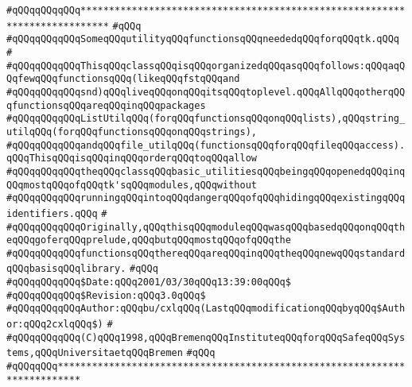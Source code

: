 \label{src/lib/tk/src/basic_util.api}
\verb|#qQQqqQQqqQQq***************************************************************************|\newline
\verb|#qQQq|\newline
\verb|#qQQqqQQqqQQqSomeqQQqutilityqQQqfunctionsqQQqneededqQQqforqQQqtk.qQQq|\newline
\verb|#|\newline
\verb|#qQQqqQQqqQQqThisqQQqclassqQQqisqQQqorganizedqQQqasqQQqfollows:qQQqaqQQqfewqQQqfunctionsqQQq(likeqQQqfstqQQqand|\newline
\verb|#qQQqqQQqqQQqsnd)qQQqliveqQQqonqQQqitsqQQqtoplevel.qQQqAllqQQqotherqQQqfunctionsqQQqareqQQqinqQQqpackages|\newline
\verb|#qQQqqQQqqQQqListUtilqQQq(forqQQqfunctionsqQQqonqQQqlists),qQQqstring_utilqQQq(forqQQqfunctionsqQQqonqQQqstrings),|\newline
\verb|#qQQqqQQqqQQqandqQQqfile_utilqQQq(functionsqQQqforqQQqfileqQQqaccess).qQQqThisqQQqisqQQqinqQQqorderqQQqtoqQQqallow|\newline
\verb|#qQQqqQQqqQQqtheqQQqclassqQQqbasic_utilitiesqQQqbeingqQQqopenedqQQqinqQQqmostqQQqofqQQqtk'sqQQqmodules,qQQqwithout|\newline
\verb|#qQQqqQQqqQQqrunningqQQqintoqQQqdangerqQQqofqQQqhidingqQQqexistingqQQqidentifiers.qQQq|\newline
\verb|#|\newline
\verb|#qQQqqQQqqQQqOriginally,qQQqthisqQQqmoduleqQQqwasqQQqbasedqQQqonqQQqtheqQQqgoferqQQqprelude,qQQqbutqQQqmostqQQqofqQQqthe|\newline
\verb|#qQQqqQQqqQQqfunctionsqQQqthereqQQqareqQQqinqQQqtheqQQqnewqQQqstandardqQQqbasisqQQqlibrary.|\newline
\verb|#qQQq|\newline
\verb|#qQQqqQQqqQQq$Date:qQQq2001/03/30qQQq13:39:00qQQq$|\newline
\verb|#qQQqqQQqqQQq$Revision:qQQq3.0qQQq$|\newline
\verb|#qQQqqQQqqQQqAuthor:qQQqbu/cxlqQQq(LastqQQqmodificationqQQqbyqQQq$Author:qQQq2cxlqQQq$)|\newline
\verb|#|\newline
\verb|#qQQqqQQqqQQq(C)qQQq1998,qQQqBremenqQQqInstituteqQQqforqQQqSafeqQQqSystems,qQQqUniversitaetqQQqBremen|\newline
\verb|#qQQq|\newline
\verb|#qQQqqQQq**************************************************************************|\newline
